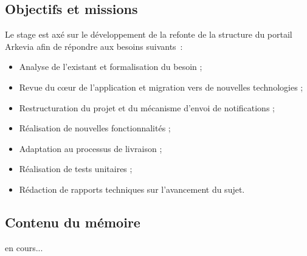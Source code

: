 \subsection*{Objectifs et missions}
Le stage est axé sur le développement de la refonte de la structure du portail Arkevia afin de répondre aux besoins suivants :
\begin{itemize}
    \item Analyse de l’existant et formalisation du besoin ;
    \item Revue du cœur de l’application et migration vers de nouvelles technologies ;
    \item Restructuration du projet et du mécanisme d'envoi de notifications ;
    \item Réalisation de nouvelles fonctionnalités ;
    \item Adaptation au processus de livraison ;
    \item Réalisation de tests unitaires ;
    \item Rédaction de rapports techniques sur l’avancement du sujet.
\end{itemize}

\subsection*{Contenu du mémoire}
en cours...